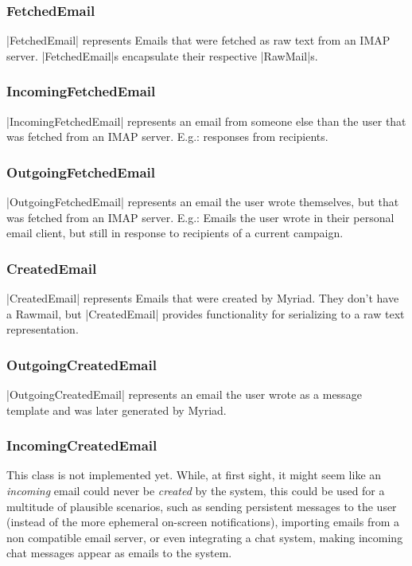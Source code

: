 \subsubsection{FetchedEmail}

|FetchedEmail| represents Emails that were fetched as raw text from an IMAP server. |FetchedEmail|s encapsulate their respective |RawMail|s.

\subsubsection{IncomingFetchedEmail}

|IncomingFetchedEmail| represents an email from someone else than the user that was fetched from an IMAP server. E.g.: responses from recipients.

\subsubsection{OutgoingFetchedEmail}

|OutgoingFetchedEmail| represents an email the user wrote themselves, but that was fetched from an IMAP server. E.g.: Emails the user wrote in their personal email client, but still in response to recipients of a current campaign.

\subsubsection{CreatedEmail}

|CreatedEmail| represents Emails that were created by Myriad. They don't have a Rawmail, but |CreatedEmail| provides functionality for serializing to a raw text representation.

\subsubsection{OutgoingCreatedEmail}

|OutgoingCreatedEmail| represents an email the user wrote as a message template  and was later generated by Myriad.

\subsubsection{IncomingCreatedEmail}

This class is not implemented yet. While, at first sight, it might seem like an \emph{incoming} email could never be \emph{created} by the system, this could be used for a multitude of plausible scenarios, such as sending persistent messages to the user (instead of the more ephemeral on-screen notifications), importing emails from a non  compatible email server, or even integrating a chat system, making incoming chat messages appear as emails to the system.

